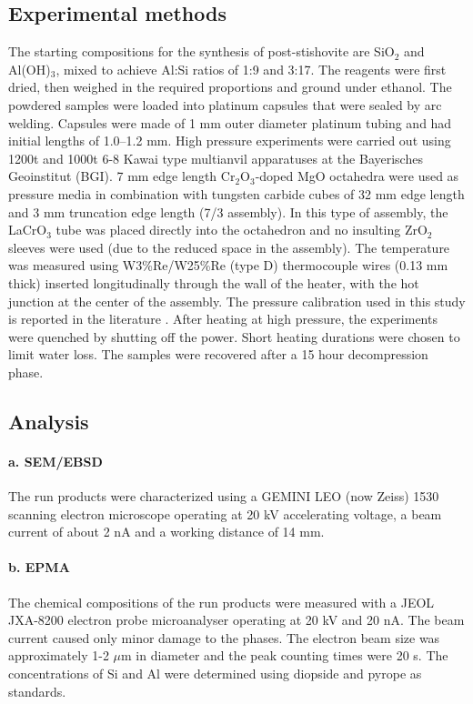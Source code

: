 \documentclass[review]{elsarticle}
\begin{document}
\subsection{Experimental methods}
The starting compositions for the synthesis of post-stishovite are SiO$_2$ and Al(OH)$_3$, mixed to achieve Al:Si ratios of 1:9 and 3:17. The reagents were first dried, then weighed in the required proportions and ground under ethanol. The powdered samples were loaded into platinum capsules that were sealed by arc welding. Capsules were made of 1 mm outer diameter platinum tubing and had initial lengths of 1.0--1.2 mm. High pressure experiments were carried out using 1200t and 1000t 6-8 Kawai type multianvil apparatuses at the Bayerisches Geoinstitut (BGI). 7 mm edge length Cr$_2$O$_3$-doped MgO octahedra were used as pressure media in combination with tungsten carbide cubes of 32 mm edge length and 3 mm truncation edge length (7/3 assembly). In this type of assembly, the LaCrO$_3$ tube was placed directly into the octahedron and no insulting ZrO$_2$ sleeves were used (due to the reduced space in the assembly). The temperature was measured using W3\%Re/W25\%Re (type D) thermocouple wires (0.13 mm thick) inserted longitudinally through the wall of the heater, with the hot junction at the center of the assembly. The pressure calibration used in this study is reported in the literature \citep{KF2005}. After heating at high pressure, the experiments were quenched by shutting off the power. Short heating durations were chosen to limit water loss. The samples were recovered after a 15 hour decompression phase.

\subsection{Analysis}
\paragraph{a. SEM/EBSD}
The run products were characterized using a GEMINI LEO (now Zeiss) 1530 scanning electron microscope operating at 20 kV accelerating voltage, a beam current of about 2 nA and a working distance of 14 mm. 

\paragraph{b. EPMA}
The chemical compositions of the run products were measured with a JEOL JXA-8200 electron probe microanalyser operating at 20 kV and 20 nA. The beam current caused only minor damage to the phases. The electron beam size was approximately 1-2 $\mu$m in diameter and the peak counting times were 20 s. The concentrations of Si and Al were determined using diopside and pyrope as standards.
\end{document}
